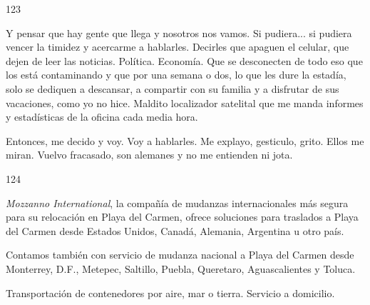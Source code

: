 \documentclass[12pt,twoside,openright,a5paper]{book}
\begin{document}
\vspace{0.5cm}

\hrulefill \hspace{0.1cm}\decofourleft\hspace{0.2cm} 123 \hspace{0.2cm}\decofourright \hspace{0.1cm}\hrulefill

\nopagebreak

\vspace{0.5cm}

\nopagebreak

Y pensar que hay gente que llega y nosotros
nos vamos. Si pudiera... si pudiera vencer la timidez y acercarme
a hablarles. Decirles que apaguen el celular, que dejen de leer las
noticias. Política. Economía. Que se desconecten de todo eso que los está
contaminando y que por una semana o dos, lo que les dure la estadía, solo
se dediquen a descansar, a compartir con su familia y a disfrutar de sus
vacaciones, como yo no hice. Maldito localizador satelital que me manda
informes y estadísticas de la oficina cada media hora.

Entonces, me decido y voy. Voy a hablarles. Me explayo, gesticulo,
grito. Ellos me miran. Vuelvo fracasado, son alemanes y no me entienden
ni jota.

\vspace{0.5cm}

\hrulefill \hspace{0.1cm}\decofourleft\hspace{0.2cm} 124 \hspace{0.2cm}\decofourright \hspace{0.1cm}\hrulefill

\nopagebreak

\vspace{0.5cm}

\nopagebreak

\emph{Mozzanno International}, la compañía de mudanzas internacionales más segura para
su relocación en Playa del Carmen, ofrece soluciones para traslados
a Playa del Carmen desde Estados Unidos, Canadá, Alemania, Argentina u otro país.

Contamos también con servicio de mudanza nacional a Playa del Carmen desde
Monterrey, D.F., Metepec, Saltillo, Puebla, Queretaro, Aguascalientes y Toluca.

Transportación de contenedores por aire, mar o tierra. Servicio a domicilio.
\end{document}
